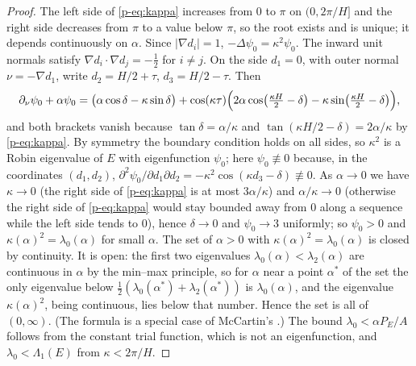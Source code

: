 \documentclass[11pt]{article}
\theoremstyle{remark}
\begin{document}
\begin{proof}
The left side of \eqref{p-eq:kappa} increases from $0$ to $\pi$ on $(0,2\pi/H]$ and the right side
decreases from $\pi$ to a value below $\pi$, so the root exists and is unique; it depends
continuously on $\alpha$. Since $|\nabla d_i|=1$, $-\Delta\psi_0=\kappa^2\psi_0$. The inward unit
normals satisfy $\nabla d_i\cdot\nabla d_j=-\tfrac12$ for $i\ne j$. On the side $d_1=0$, with
outer normal $\nu=-\nabla d_1$, write $d_2=H/2+\tau$, $d_3=H/2-\tau$. Then
\[
  \partial_\nu\psi_0+\alpha\psi_0
  =\bigl(\alpha\cos\delta-\kappa\sin\delta\bigr)
  +\cos(\kappa\tau)\Bigl(2\alpha\cos\bigl(\tfrac{\kappa H}{2}-\delta\bigr)
     -\kappa\sin\bigl(\tfrac{\kappa H}{2}-\delta\bigr)\Bigr),
\]
and both brackets vanish because $\tan\delta=\alpha/\kappa$ and
$\tan(\kappa H/2-\delta)=2\alpha/\kappa$ by \eqref{p-eq:kappa}. By symmetry the boundary condition
holds on all sides, so $\kappa^2$ is a Robin eigenvalue of $E$ with eigenfunction $\psi_0$;
here $\psi_0\not\equiv0$ because, in the coordinates $(d_1,d_2)$,
$\partial^2\psi_0/\partial d_1\partial d_2=-\kappa^2\cos(\kappa d_3-\delta)\not\equiv0$. As
$\alpha\to0$ we have $\kappa\to0$ (the right side of \eqref{p-eq:kappa} is at most $3\alpha/\kappa$)
and $\alpha/\kappa\to0$ (otherwise the right side of \eqref{p-eq:kappa} would stay bounded away
from $0$ along a sequence while the left side tends to $0$), hence $\delta\to0$ and
$\psi_0\to3$ uniformly; so $\psi_0>0$ and $\kappa(\alpha)^2=\lambda_0(\alpha)$ for small $\alpha$.
The set of $\alpha>0$ with $\kappa(\alpha)^2=\lambda_0(\alpha)$ is closed by continuity. It is
open: the first two eigenvalues $\lambda_0(\alpha)<\lambda_2(\alpha)$ are continuous in $\alpha$
by the min--max principle, so for $\alpha$ near a point $\alpha^*$ of the set the only eigenvalue
below $\frac12(\lambda_0(\alpha^*)+\lambda_2(\alpha^*))$ is $\lambda_0(\alpha)$, and the
eigenvalue $\kappa(\alpha)^2$, being continuous, lies below that number. Hence the set is all of
$(0,\infty)$.
(The formula is a special case of McCartin's \cite{McCartin}.) The bound
$\lambda_0<\alpha P_E/A$ follows from the constant trial function, which is not an
eigenfunction, and $\lambda_0<\Lambda_1(E)$ from $\kappa<2\pi/H$.
\end{proof}
\end{document}
